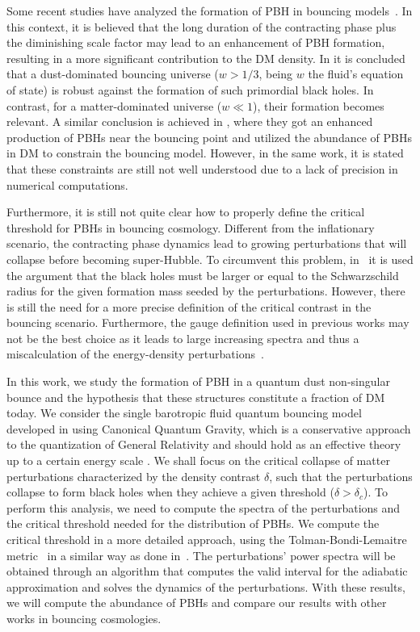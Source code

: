\documentclass[a4paper,11pt]{article}
\begin{document}
Some recent studies have analyzed the formation of PBH in bouncing models~\cite{Carr2011, Corman2022, Chen2017, Chen2023, Quintin2016, Banerjee2022, Papanikolaou2024}. In this context, it is believed that the long duration of the contracting phase plus the diminishing scale factor may lead to an enhancement of PBH formation, resulting in a more significant contribution to the DM density. In \cite{Quintin2016} it is concluded that a dust-dominated bouncing universe ($w > 1/3$, being $w$ the fluid's equation of state) is robust against the formation of such primordial black holes. In contrast, for a matter-dominated universe ($w \ll 1$), their formation becomes relevant. A similar conclusion is achieved in \cite{Chen2023}, where they got an enhanced production of PBHs near the bouncing point and utilized the abundance of PBHs in DM to constrain the bouncing model. However, in the same work, it is stated that these constraints are still not well understood due to a lack of precision in numerical computations. 

Furthermore, it is still not quite clear how to properly define the critical threshold for PBHs in bouncing cosmology. Different from the inflationary scenario, the contracting phase dynamics lead to growing perturbations that will collapse before becoming super-Hubble. To circumvent this problem, in~\cite{Quintin2016} it is used the argument that the black holes must be larger or equal to the Schwarzschild radius for the given formation mass seeded by the perturbations. However, there is still the need for a more precise definition of the critical contrast in the bouncing scenario. Furthermore, the gauge definition used in previous works may not be the best choice as it leads to large increasing spectra and thus a miscalculation of the energy-density perturbations~\cite{vitenti2012large}.

In this work, we study the formation of PBH in a quantum dust non-singular bounce and the hypothesis that these structures constitute a fraction of DM today. We consider the single barotropic fluid quantum bouncing model developed in \cite{nelson_peter_bouncing_original, nelson2000bohm, nelson2021bouncing} using Canonical Quantum Gravity, which is a conservative approach to the quantization of General Relativity and should hold as an effective theory up to a certain energy scale \cite{nelson2021bouncing}. 
We shall focus on the critical collapse of matter perturbations characterized by the density contrast $\delta$, such that the perturbations collapse to form black holes when they achieve a given threshold ($\delta > \delta_c$). To perform this analysis, we need to compute the spectra of the perturbations and the critical threshold needed for the distribution of PBHs. We compute the critical threshold in a more detailed approach, using the Tolman-Bondi-Lemaitre metric~\cite{Tolman1934, Lemaitre1933} in a similar way as done in~\cite{Martin2020}. The perturbations' power spectra will be obtained through an algorithm that computes the valid interval for the adiabatic approximation and solves the dynamics of the perturbations. With these results, we will compute the abundance of PBHs and compare our results with other works in bouncing cosmologies.
\end{document}

